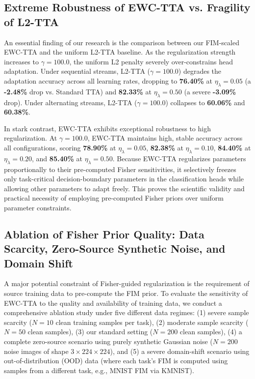 \documentclass{article}
\theoremstyle{plain}
\theoremstyle{definition}
\theoremstyle{remark}
\begin{document}
\subsection{Extreme Robustness of EWC-TTA vs. Fragility of L2-TTA}
An essential finding of our research is the comparison between our FIM-scaled EWC-TTA and the uniform L2-TTA baseline. As the regularization strength increases to $\gamma=100.0$, the uniform L2 penalty severely over-constrains head adaptation. Under sequential streams, L2-TTA ($\gamma=100.0$) degrades the adaptation accuracy across all learning rates, dropping to \textbf{76.40\%} at $\eta_\lambda=0.05$ (a \textbf{-2.48\%} drop vs. Standard TTA) and \textbf{82.33\%} at $\eta_\lambda=0.50$ (a severe \textbf{-3.09\%} drop). Under alternating streams, L2-TTA ($\gamma=100.0$) collapses to \textbf{60.06\%} and \textbf{60.38\%}.

In stark contrast, EWC-TTA exhibits exceptional robustness to high regularization. At $\gamma=100.0$, EWC-TTA maintains high, stable accuracy across all configurations, scoring \textbf{78.90\%} at $\eta_\lambda=0.05$, \textbf{82.38\%} at $\eta_\lambda=0.10$, \textbf{84.40\%} at $\eta_\lambda=0.20$, and \textbf{85.40\%} at $\eta_\lambda=0.50$. Because EWC-TTA regularizes parameters proportionally to their pre-computed Fisher sensitivities, it selectively freezes only task-critical decision-boundary parameters in the classification heads while allowing other parameters to adapt freely. This proves the scientific validity and practical necessity of employing pre-computed Fisher priors over uniform parameter constraints.

\subsection{Ablation of Fisher Prior Quality: Data Scarcity, Zero-Source Synthetic Noise, and Domain Shift}
A major potential constraint of Fisher-guided regularization is the requirement of source training data to pre-compute the FIM prior. To evaluate the sensitivity of EWC-TTA to the quality and availability of training data, we conduct a comprehensive ablation study under five different data regimes: (1) severe sample scarcity ($N=10$ clean training samples per task), (2) moderate sample scarcity ($N=50$ clean samples), (3) our standard setting ($N=200$ clean samples), (4) a complete zero-source scenario using purely synthetic Gaussian noise ($N=200$ noise images of shape $3 \times 224 \times 224$), and (5) a severe domain-shift scenario using out-of-distribution (OOD) data (where each task's FIM is computed using samples from a different task, e.g., MNIST FIM via KMNIST).
\end{document}
